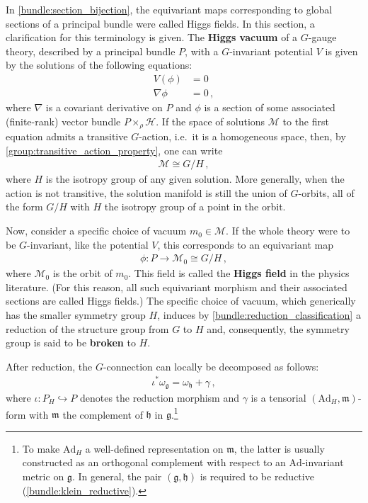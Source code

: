     In \cref{bundle:section_bijection}, the equivariant maps corresponding to global sections of a principal bundle were called Higgs fields. In this section, a clarification for this terminology is given. The \textbf{Higgs vacuum} of a $G$-gauge theory, described by a principal bundle $P$, with a $G$-invariant potential $V$ is given by the solutions of the following equations:
    \begin{align}
        V(\phi) &= 0\\
        \nabla\phi &= 0\,,
    \end{align}
    where $\nabla$ is a covariant derivative on $P$ and $\phi$ is a section of some associated (finite-rank) vector bundle $P\times_\rho\mathcal{H}$. If the space of solutions $\mathcal{M}$ to the first equation admits a transitive $G$-action, i.e.~it is a homogeneous space, then, by \cref{group:transitive_action_property}, one can write
    \begin{gather}
        \mathcal{M}\cong G/H\,,
    \end{gather}
    where $H$ is the isotropy group of any given solution. More generally, when the action is not transitive, the solution manifold is still the union of $G$-orbits, all of the form $G/H$ with $H$ the isotropy group of a point in the orbit.

    Now, consider a specific choice of vacuum $m_0\in\mathcal{M}$. If the whole theory were to be $G$-invariant, like the potential $V$, this corresponds to an equivariant map
    \begin{gather}
        \phi:P\rightarrow \mathcal{M}_0\cong G/H\,,
    \end{gather}
    where $\mathcal{M}_0$ is the orbit of $m_0$. This field is called the \textbf{Higgs field} in the physics literature. (For this reason, all such equivariant morphism and their associated sections are called Higgs fields.) The specific choice of vacuum, which generically has the smaller symmetry group $H$, induces by \cref{bundle:reduction_classification} a reduction of the structure group from $G$ to $H$ and, consequently, the symmetry group is said to be \textbf{broken} to $H$.

    After reduction, the $G$-connection can locally be decomposed as follows:
    \begin{gather}
        \iota^*\omega_{\mathfrak{g}} = \omega_{\mathfrak{h}} + \gamma\,,
    \end{gather}
    where $\iota:P_H\hookrightarrow P$ denotes the reduction morphism and $\gamma$ is a tensorial $(\mathrm{Ad}_H,\mathfrak{m})$-form with $\mathfrak{m}$ the complement of $\mathfrak{h}$ in $\mathfrak{g}$.\footnote{To make $\mathrm{Ad}_H$ a well-defined representation on $\mathfrak{m}$, the latter is usually constructed as an orthogonal complement with respect to an $\mathrm{Ad}$-invariant metric on $\mathfrak{g}$. In general, the pair $(\mathfrak{g},\mathfrak{h})$ is required to be reductive (\cref{bundle:klein_reductive}).}

